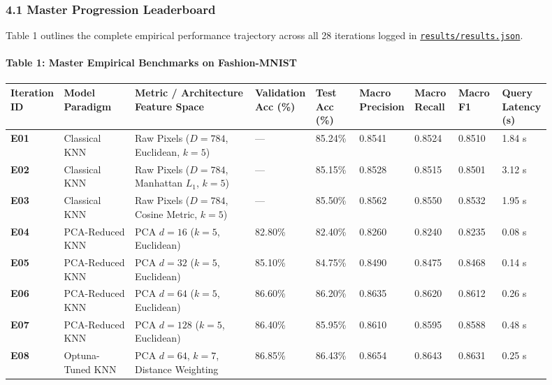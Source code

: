\subsubsection{4.1 Master Progression
Leaderboard}\label{41-master-progression-leaderboard}

Table 1 outlines the complete empirical performance trajectory across
all 28 iterations logged in
\href{results/results.json}{\texttt{results/results.json}}.

\paragraph{Table 1: Master Empirical Benchmarks on
Fashion-MNIST}\label{table-1-master-empirical-benchmarks-on-fashion-mnist}

\begin{longtable}[]{@{}p{0.06\linewidth}p{0.13\linewidth}p{0.22\linewidth}p{0.08\linewidth}p{0.08\linewidth}p{0.08\linewidth}p{0.08\linewidth}p{0.08\linewidth}p{0.09\linewidth}@{}}
\toprule\noalign{}
Iteration ID & Model Paradigm & Metric / Architecture Feature Space &
Validation Acc (\%) & Test Acc (\%) & Macro Precision & Macro Recall &
Macro F1 & Query Latency (s) \\
\midrule\noalign{}
\endhead
\bottomrule\noalign{}
\endlastfoot
\textbf{E01} & Classical KNN & Raw Pixels (\(D=784\), Euclidean,
\(k=5\)) & --- & 85.24\% & 0.8541 & 0.8524 & 0.8510 & 1.84 s \\
\textbf{E02} & Classical KNN & Raw Pixels (\(D=784\), Manhattan \(L_1\),
\(k=5\)) & --- & 85.15\% & 0.8528 & 0.8515 & 0.8501 & 3.12 s \\
\textbf{E03} & Classical KNN & Raw Pixels (\(D=784\), Cosine Metric,
\(k=5\)) & --- & 85.50\% & 0.8562 & 0.8550 & 0.8532 & 1.95 s \\
\textbf{E04} & PCA-Reduced KNN & PCA \(d=16\) (\(k=5\), Euclidean) &
82.80\% & 82.40\% & 0.8260 & 0.8240 & 0.8235 & 0.08 s \\
\textbf{E05} & PCA-Reduced KNN & PCA \(d=32\) (\(k=5\), Euclidean) &
85.10\% & 84.75\% & 0.8490 & 0.8475 & 0.8468 & 0.14 s \\
\textbf{E06} & PCA-Reduced KNN & PCA \(d=64\) (\(k=5\), Euclidean) &
86.60\% & 86.20\% & 0.8635 & 0.8620 & 0.8612 & 0.26 s \\
\textbf{E07} & PCA-Reduced KNN & PCA \(d=128\) (\(k=5\), Euclidean) &
86.40\% & 85.95\% & 0.8610 & 0.8595 & 0.8588 & 0.48 s \\
\textbf{E08} & Optuna-Tuned KNN & PCA \(d=64\), \(k=7\), Distance
Weighting & 86.85\% & 86.43\% & 0.8654 & 0.8643 & 0.8631 & 0.25 s \\

\end{longtable}
